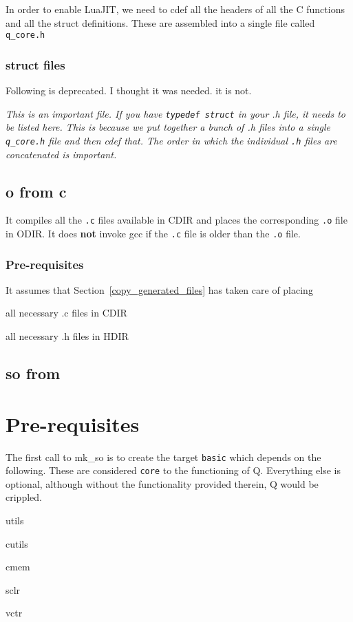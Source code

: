 In order to enable LuaJIT, we need to cdef all the headers of all the C
functions and all the struct definitions. These are assembled into a single file
called \verb+q_core.h+

\subsubsection{struct files}
\label{struct_files}

Following is deprecated. I thought it was needed. it is not.

{\em 
This is an important file. If you have {\tt typedef struct} in your .h file, it
needs to be listed here. This is because we put together a bunch of .h files
into a single {\tt q\_core.h} file and then cdef that. The order in which the individual {\tt .h} files are concatenated is important.

}
\subsection{o from c}
\label{o_from_c}

It compiles all the {\tt .c} files available in CDIR and places 
the corresponding {\tt .o} file in ODIR. It does {\bf not} invoke gcc if the {\tt.c}
file is older than the {\tt .o} file. 


\subsubsection{Pre-requisites}
It assumes that Section~\ref{copy_generated_files} has taken care of placing
\be
\item all necessary .c files in CDIR
\item all necessary .h files in HDIR
\ee

\subsection{so from}
\label{so_from_o}
\TBC

\section{Pre-requisites}
The first call to mk\_so is to create the target {\tt basic} which depends on
the following. These are considered {\tt core} to the functioning of Q.
Everything else is optional, although without the functionality provided
therein, Q would be crippled.
\be
\item utils
\item cutils
\item cmem
\item sclr
\item vctr
\ee


